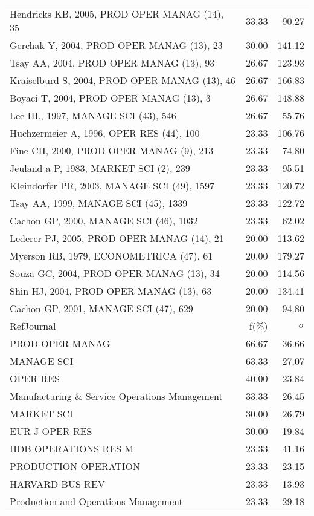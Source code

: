 \documentclass[a4paper,11pt]{report}
\begin{document}
\begin{landscape}
\begin{table}[!ht]
{\begin{tabular}{|l r r|}
Hendricks KB, 2005, PROD OPER MANAG (14), 35 & 33.33 & 90.27\\
Gerchak Y, 2004, PROD OPER MANAG (13), 23 & 30.00 & 141.12\\
Tsay AA, 2004, PROD OPER MANAG (13), 93 & 26.67 & 123.93\\
Kraiselburd S, 2004, PROD OPER MANAG (13), 46 & 26.67 & 166.83\\
Boyaci T, 2004, PROD OPER MANAG (13), 3 & 26.67 & 148.88\\
Lee HL, 1997, MANAGE SCI (43), 546 & 26.67 & 55.76\\
Huchzermeier A, 1996, OPER RES (44), 100 & 23.33 & 106.76\\
Fine CH, 2000, PROD OPER MANAG (9), 213 & 23.33 & 74.80\\
Jeuland a P, 1983, MARKET SCI (2), 239 & 23.33 & 95.51\\
Kleindorfer PR, 2003, MANAGE SCI (49), 1597 & 23.33 & 120.72\\
Tsay AA, 1999, MANAGE SCI (45), 1339 & 23.33 & 122.72\\
Cachon GP, 2000, MANAGE SCI (46), 1032 & 23.33 & 62.02\\
Lederer PJ, 2005, PROD OPER MANAG (14), 21 & 20.00 & 113.62\\
Myerson RB, 1979, ECONOMETRICA (47), 61 & 20.00 & 179.27\\
Souza GC, 2004, PROD OPER MANAG (13), 34 & 20.00 & 114.56\\
Shin HJ, 2004, PROD OPER MANAG (13), 63 & 20.00 & 134.41\\
Cachon GP, 2001, MANAGE SCI (47), 629 & 20.00 & 94.80\\
\hline
\hline
RefJournal & f(\%) & $\sigma$\\
\hline
PROD OPER MANAG & 66.67 & 36.66\\
MANAGE SCI & 63.33 & 27.07\\
OPER RES & 40.00 & 23.84\\
Manufacturing \& Service Operations Management & 33.33 & 26.45\\
MARKET SCI & 30.00 & 26.79\\
EUR J OPER RES & 30.00 & 19.84\\
HDB OPERATIONS RES M & 23.33 & 41.16\\
PRODUCTION OPERATION & 23.33 & 23.15\\
HARVARD BUS REV & 23.33 & 13.93\\
Production and Operations Management & 23.33 & 29.18\\
\hline
\end{tabular}
}
\end{table}


\end{landscape}
\end{document}
